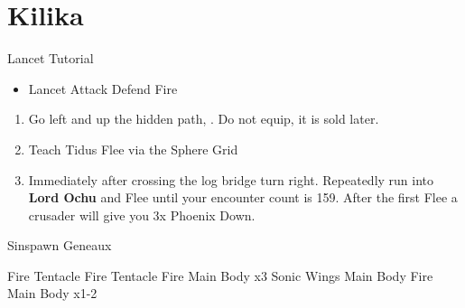 \chapter{Kilika}
\begin{battle}{Lancet Tutorial}
	\begin{itemize}
		\item \sd
		      \kimahrif Lancet
		      \kimahrif Attack
		      \tidusf Defend
		      \luluf Fire
	\end{itemize}
\end{battle}
\begin{enumerate}[resume]
	\item Go left and up the hidden path, . Do not equip, it is sold later.
	\item Teach Tidus Flee via the Sphere Grid
	\item Immediately after crossing the log bridge turn right. Repeatedly run into \textbf{Lord Ochu} and Flee until your encounter count is 159. After the first Flee a crusader will give you 3x Phoenix Down.
\end{enumerate}
\begin{battle}[3000]{Sinspawn Geneaux}
	\begin{itemize}
		\summon{\valefor}
		\valeforf Fire Tentacle
		\valeforf Fire Tentacle
		\valeforf Fire Main Body x3
		\valeforf Sonic Wings Main Body
		\valeforf Fire Main Body x1-2
	\end{itemize}
\end{battle}
